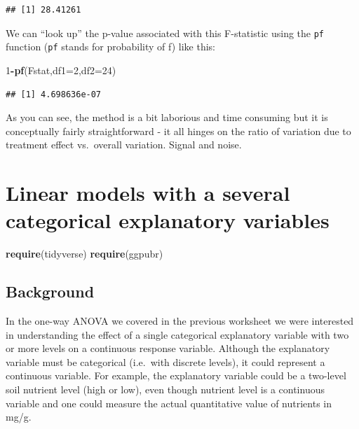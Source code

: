 \documentclass[
  a4paperpaper,
]{book}
\newenvironment{Shaded}{\begin{snugshade}}{\end{snugshade}}
\newcommand{\DataTypeTok}[1]{\textcolor[rgb]{0.13,0.29,0.53}{#1}}
\newcommand{\DecValTok}[1]{\textcolor[rgb]{0.00,0.00,0.81}{#1}}
\newcommand{\KeywordTok}[1]{\textcolor[rgb]{0.13,0.29,0.53}{\textbf{#1}}}
\newcommand{\NormalTok}[1]{#1}
\newcommand{\OperatorTok}[1]{\textcolor[rgb]{0.81,0.36,0.00}{\textbf{#1}}}
\begin{document}
\begin{verbatim}
## [1] 28.41261
\end{verbatim}

We can ``look up'' the p-value associated with this F-statistic using the \texttt{pf} function (\texttt{pf} stands for probability of f) like this:

\begin{Shaded}
\begin{Highlighting}[]
\DecValTok{1}\OperatorTok{{-}}\KeywordTok{pf}\NormalTok{(Fstat,}\DataTypeTok{df1=}\DecValTok{2}\NormalTok{,}\DataTypeTok{df2=}\DecValTok{24}\NormalTok{)}
\end{Highlighting}
\end{Shaded}

\begin{verbatim}
## [1] 4.698636e-07
\end{verbatim}

As you can see, the method is a bit laborious and time consuming but it is conceptually fairly straightforward - it all hinges on the ratio of variation due to treatment effect vs.~overall variation. Signal and noise.

\hypertarget{linear-models-with-a-several-categorical-explanatory-variables}{%
\chapter{Linear models with a several categorical explanatory variables}\label{linear-models-with-a-several-categorical-explanatory-variables}}

\begin{Shaded}
\begin{Highlighting}[]
\KeywordTok{require}\NormalTok{(tidyverse)}
\KeywordTok{require}\NormalTok{(ggpubr)}
\end{Highlighting}
\end{Shaded}

\hypertarget{background}{%
\section{Background}\label{background}}

In the one-way ANOVA we covered in the previous worksheet we were interested in understanding the effect of a single categorical explanatory variable with two or more levels on a continuous response variable. Although the explanatory variable must be categorical (i.e.~with discrete levels), it could represent a continuous variable. For example, the explanatory variable could be a two-level soil nutrient level (high or low), even though nutrient level is a continuous variable and one could measure the actual quantitative value of nutrients in mg/g.
\end{document}
